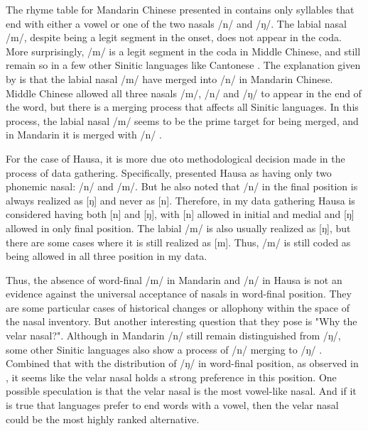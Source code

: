 \par
The rhyme table for Mandarin Chinese presented in \citet{liMandarinChineseFunctional2009} contains only syllables that end with either a vowel or one of the two nasals /n/ and /ŋ/.
The labial nasal /m/, despite being a legit segment in the onset, does not appear in the coda.
More surprisingly, /m/ is a legit segment in the coda in Middle Chinese, and still remain so in a few other Sinitic languages like Cantonese \citep{zee1985sound}. 
The explanation given by \citet{zee1985sound} is that the labial nasal /m/ have merged into /n/ in Mandarin Chinese.
Middle Chinese allowed all three nasals /m/, /n/ and /ŋ/ to appear in the end of the word, but there is a merging process that affects all Sinitic languages.
In this process, the labial nasal /m/ seems to be the prime target for being merged, and in Mandarin it is merged with /n/ \citep{zee1985sound}.

\par
For the case of Hausa, it is more due oto methodological decision made in the process of data gathering. Specifically, \citet{newmanHausaLanguageEncyclopedic2000} presented Hausa as having only two phonemic nasal: /n/ and /m/. 
But he also noted that /n/ in the final position is always realized as [ŋ] and never as [n]. 
Therefore, in my data gathering Hausa is considered having both [n] and [ŋ], with [n] allowed in initial and medial and [ŋ] allowed in only final position.
The labial /m/ is also usually realized as [ŋ], but there are some cases where it is still realized as [m].
Thus, /m/ is still coded as being allowed in all three position in my data.

\par
Thus, the absence of word-final /m/ in Mandarin and /n/ in Hausa is not an evidence against the universal acceptance of nasals in word-final position.
They are some particular cases of historical changes or allophony within the space of the nasal inventory.
But another interesting question that they pose is "Why the velar nasal?".
Although in Mandarin /n/ still remain distinguished from /ŋ/, some other Sinitic languages also show a process of /n/ merging to /ŋ/ \citet{zee1985sound}.
Combined that with the distribution of /ŋ/ in word-final position, as observed in \citet{wals-9}, it seems like the velar nasal holds a strong preference in this position.
One possible speculation is that the velar nasal is the most vowel-like nasal.
And if it is true that languages prefer to end words with a vowel, then the velar nasal could be the most highly ranked alternative.
